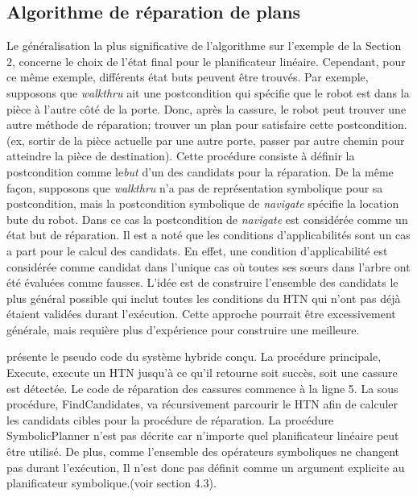 \documentclass[a4paper,twoside,french]{article}
\begin{document}
			\subsection{Algorithme de réparation de plans}
			\noindent Le généralisation la plus significative de l'algorithme sur l'exemple de la Section 2, concerne le choix de l'état final pour le planificateur linéaire. Cependant, pour ce même exemple, différents état buts peuvent être trouvés.  Par exemple, supposons que {\em walkthru} ait une postcondition qui spécifie que le robot est dans la pièce à l'autre côté de la porte. Donc, après la cassure, le robot peut trouver une autre méthode de réparation; trouver un plan pour satisfaire cette postcondition. (ex, sortir de la pièce actuelle par une autre porte, passer par autre chemin pour atteindre la pièce de destination). Cette procédure consiste à définir la postcondition comme le{\em  but} d'un  des candidats pour la réparation. De la même façon, supposons que {\em walkthru} n'a pas de représentation symbolique pour sa postcondition, mais la postcondition symbolique de {\em navigate} spécifie la location bute du robot. Dans ce cas la postcondition de {\em navigate} est considérée comme un état but de réparation. Il est a noté que les conditions d'applicabilités sont un cas a part pour le calcul des candidats. En effet, une condition d'applicabilité est considérée comme candidat dans l'unique cas où toutes ses sœurs dans l'arbre ont été évaluées comme fausses.
			L'idée est de construire l'ensemble des candidats le plus général possible qui inclut toutes les conditions du HTN qui n'ont pas déjà étaient validées durant l'exécution. Cette approche pourrait être excessivement générale, mais requière  plus d'expérience pour construire une meilleure. 
			\par {} présente le pseudo code du système hybride conçu. La procédure principale, {\sc Execute}, execute un HTN jusqu'à ce qu'il retourne soit succès, soit une cassure est détectée. Le code de réparation des cassures commence à la ligne 5. La sous procédure, {\sc FindCandidates}, va récursivement parcourir le HTN afin de calculer les candidats cibles pour la procédure de réparation. La procédure {\sc SymbolicPlanner} n'est pas décrite car n'importe quel planificateur linéaire peut être utilisé. De plus, comme l'ensemble des opérateurs symboliques ne changent pas durant l'exécution, Il n'est donc pas définit comme un argument explicite au planificateur symbolique.(voir section 4.3). 
			
\end{document}

